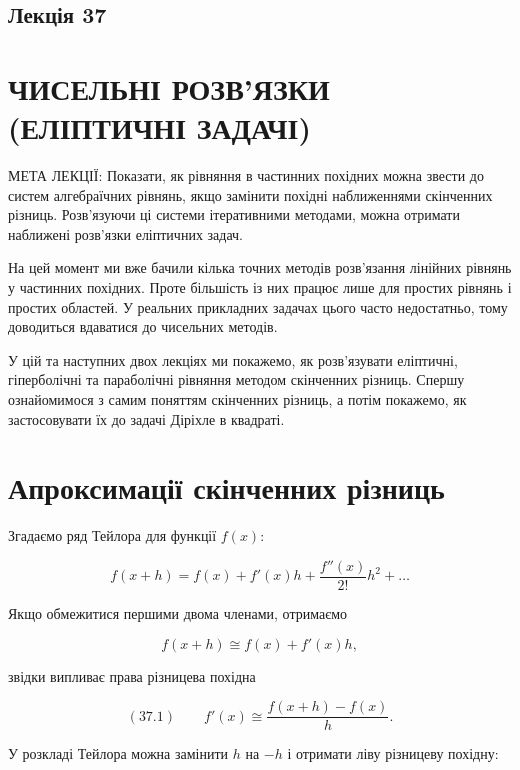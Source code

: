 \documentclass[
  ukrainian,
]{article}
\begin{document}
\subsection{Лекція 37}\label{ux43bux435ux43aux446ux456ux44f-37}

\section{ЧИСЕЛЬНІ РОЗВ'ЯЗКИ (ЕЛІПТИЧНІ
ЗАДАЧІ)}\label{ux447ux438ux441ux435ux43bux44cux43dux456-ux440ux43eux437ux432ux44fux437ux43aux438-ux435ux43bux456ux43fux442ux438ux447ux43dux456-ux437ux430ux434ux430ux447ux456}

МЕТА ЛЕКЦІЇ: Показати, як рівняння в частинних похідних можна звести до
систем алгебраїчних рівнянь, якщо замінити похідні наближеннями
скінченних різниць. Розв'язуючи ці системи ітеративними методами, можна
отримати наближені розв'язки еліптичних задач.

На цей момент ми вже бачили кілька точних методів розв'язання лінійних
рівнянь у частинних похідних. Проте більшість із них працює лише для
простих рівнянь і простих областей. У реальних прикладних задачах цього
часто недостатньо, тому доводиться вдаватися до чисельних методів.

У цій та наступних двох лекціях ми покажемо, як розв'язувати еліптичні,
гіперболічні та параболічні рівняння методом скінченних різниць. Спершу
ознайомимося з самим поняттям скінченних різниць, а потім покажемо, як
застосовувати їх до задачі Діріхле в квадраті.

\section{Апроксимації скінченних
різниць}\label{ux430ux43fux440ux43eux43aux441ux438ux43cux430ux446ux456ux457-ux441ux43aux456ux43dux447ux435ux43dux43dux438ux445-ux440ux456ux437ux43dux438ux446ux44c}

Згадаємо ряд Тейлора для функції \(f(x)\):

\[
f(x+h)=f(x)+f'(x)h+\frac{f''(x)}{2!}h^2+\dots
\]

Якщо обмежитися першими двома членами, отримаємо

\[
f(x+h)\cong f(x)+f'(x)h,
\]

звідки випливає права різницева похідна

\[
(37.1)\qquad f'(x)\cong \frac{f(x+h)-f(x)}{h}.
\]

У розкладі Тейлора можна замінити \(h\) на \(-h\) і отримати ліву
різницеву похідну:
\end{document}

